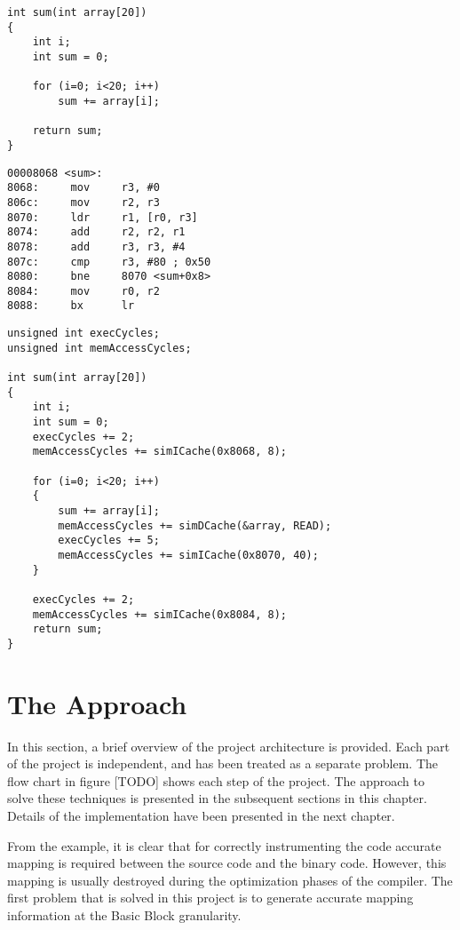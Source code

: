 \begin{minipage}{0.5\textwidth}
\begin{lstlisting}[caption={Simple C Code},label={lst:sumCCode}]
int sum(int array[20])
{
	int i;
	int sum = 0;
	
	for (i=0; i<20; i++)
		sum += array[i];
	
	return sum;
}
\end{lstlisting}
\end{minipage}%
\begin{minipage}{0.5\textwidth}
\begin{lstlisting}[caption={Objdump Code},label={lst:sumObjCode}]
00008068 <sum>:
8068:     mov     r3, #0
806c:     mov     r2, r3
8070:     ldr     r1, [r0, r3]
8074:     add     r2, r2, r1
8078:     add     r3, r3, #4
807c:     cmp     r3, #80 ; 0x50
8080:     bne     8070 <sum+0x8>
8084:     mov     r0, r2
8088:     bx      lr
\end{lstlisting}
\end{minipage}

\begin{lstlisting}[caption={Instrumented Code},label={lst:sumInstCode}]
unsigned int execCycles;
unsigned int memAccessCycles;

int sum(int array[20])
{
	int i;
	int sum = 0;
	execCycles += 2;
	memAccessCycles += simICache(0x8068, 8);
	
	for (i=0; i<20; i++)
	{
		sum += array[i];
		memAccessCycles += simDCache(&array, READ);
		execCycles += 5;
		memAccessCycles += simICache(0x8070, 40);
	}
	
	execCycles += 2;
	memAccessCycles += simICache(0x8084, 8);
	return sum;
}
\end{lstlisting}

\section{The Approach}
In this section, a brief overview of the project architecture is provided. Each part of the project is independent, and has been treated as a separate problem. The flow chart in figure [TODO] shows each step of the project. The approach to solve these techniques is presented in the subsequent sections in this chapter. Details of the implementation have been presented in the next chapter.

From the example, it is clear that for correctly instrumenting the code accurate mapping is required between the source code and the binary code. However, this mapping is usually destroyed during the optimization phases of the compiler. The first problem that is solved in this project is to generate accurate mapping information at the Basic Block granularity. 

